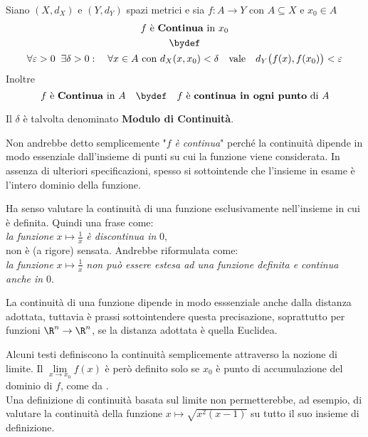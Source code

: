 \begin{definition}
	\label{def:funz_cont}
	Siano $(X,d_X)$ e $(Y,d_Y)$ spazi metrici e sia $f: A \to Y$ con $A \subseteq X$ e $x_0 \in A$
	\begin{equation*}
		\begin{gathered}
			f \text{ è \textbf{Continua} in } x_0\\
			\bydef\\
			\forall \varepsilon > 0\;\;\exists \delta > 0:\quad \forall x \in A \text{ con } d_X(x,x_0)<\delta \quad \text{vale} \quad d_Y \bigl(f(x),f(x_0)\bigr) < \varepsilon
		\end{gathered}
	\end{equation*}
	Inoltre
	\[f \text{ è \textbf{Continua} in } A \quad \bydef \quad f \text{ è \textbf{continua in ogni punto} di } A\]
	\vspace*{-\baselineskip}
	\begin{note}
		Il $\delta$ è talvolta denominato \textbf{Modulo di Continuità}.
	\end{note}
	\begin{note}
		Non andrebbe detto semplicemente "$f$ \textit{è continua}" perché la continuità dipende in modo essenziale dall'insieme di punti su cui la funzione viene considerata. In assenza di ulteriori specificazioni, spesso si sottointende che l'insieme in esame è l'intero dominio della funzione.
	\end{note}
	\begin{note}
		Ha senso valutare la continuità di una funzione esclusivamente nell'insieme in cui è definita. Quindi una frase come:\\
		\textit{la funzione} $x \mapsto \frac{1}{x}$ \textit{è discontinua in} $0$,\\
		non è (a rigore) sensata. Andrebbe riformulata come:\\
		\textit{la funzione} $x \mapsto \frac{1}{x}$ \textit{non può essere estesa ad una funzione definita e continua anche in} $0$.
	\end{note}
	\begin{note}
		La continuità di una funzione dipende in modo esssenziale anche dalla distanza adottata, tuttavia è prassi sottointendere questa precisazione, soprattutto per funzioni $\R^n \to \R^n$, se la distanza adottata è quella Euclidea.
	\end{note}
\end{definition}
\begin{observation}
	Alcuni testi definiscono la continuità semplicemente attraverso la nozione di limite. Il $\lim\limits_{x \to x_0} f(x)$ è però definito solo se $x_0$ è punto di accumulazione del dominio di $f$, come da .\\
	Una definizione di continuità basata sul limite non permetterebbe, ad esempio, di valutare la continuità della funzione $x \mapsto \sqrt{x^2(x-1)}$ su tutto il suo insieme di definizione.
\end{observation}

